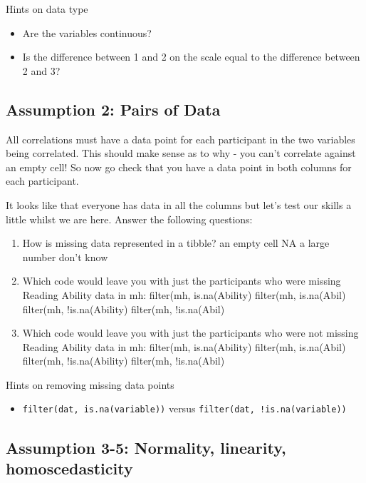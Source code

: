 \documentclass[]{book}
\providecommand{\tightlist}{%
  \setlength{\itemsep}{0pt}\setlength{\parskip}{0pt}}
\begin{document}
Hints on data type

\begin{itemize}
\tightlist
\item
  Are the variables continuous?
\item
  Is the difference between 1 and 2 on the scale equal to the difference between 2 and 3?
\end{itemize}

\hypertarget{assumption-2-pairs-of-data}{%
\subsection{Assumption 2: Pairs of Data}\label{assumption-2-pairs-of-data}}

All correlations must have a data point for each participant in the two variables being correlated. This should make sense as to why - you can't correlate against an empty cell! So now go check that you have a data point in both columns for each participant.

It looks like that everyone has data in all the columns but let's test our skills a little whilst we are here. Answer the following questions:

\begin{enumerate}
\def\labelenumi{\arabic{enumi}.}
\tightlist
\item
  How is missing data represented in a tibble? an empty cell NA a large number don't know
\item
  Which code would leave you with just the participants who were missing Reading Ability data in mh:
   filter(mh, is.na(Ability) filter(mh, is.na(Abil) filter(mh, !is.na(Ability) filter(mh, !is.na(Abil)
\item
  Which code would leave you with just the participants who were not missing Reading Ability data in mh: filter(mh, is.na(Ability) filter(mh, is.na(Abil) filter(mh, !is.na(Ability) filter(mh, !is.na(Abil)
\end{enumerate}

Hints on removing missing data points

\begin{itemize}
\tightlist
\item
  \texttt{filter(dat,\ is.na(variable))} versus \texttt{filter(dat,\ !is.na(variable))}
\end{itemize}

\hypertarget{assumption-3-5-normality-linearity-homoscedasticity}{%
\subsection{Assumption 3-5: Normality, linearity, homoscedasticity}\label{assumption-3-5-normality-linearity-homoscedasticity}}
\end{document}
